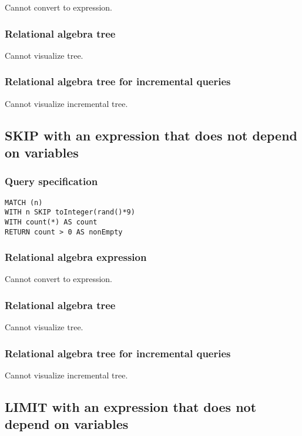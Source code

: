 Cannot convert to expression.

\subsubsection*{Relational algebra tree}

Cannot visualize tree.

\subsubsection*{Relational algebra tree for incremental queries}

Cannot visualize incremental tree.

\subsection{SKIP with an expression that does not depend on variables}

\subsubsection*{Query specification}

\begin{lstlisting}
MATCH (n)
WITH n SKIP toInteger(rand()*9)
WITH count(*) AS count
RETURN count > 0 AS nonEmpty
\end{lstlisting}

\subsubsection*{Relational algebra expression}

Cannot convert to expression.

\subsubsection*{Relational algebra tree}

Cannot visualize tree.

\subsubsection*{Relational algebra tree for incremental queries}

Cannot visualize incremental tree.

\subsection{LIMIT with an expression that does not depend on variables}

